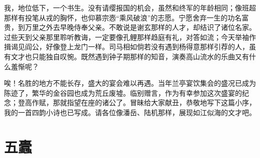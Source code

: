 \documentclass[12pt,UTF-8,openany,a4]{ctexbook}
\begin{document}
\begin{large}
    我，地位低下，一个书生。没有请缨报国的机会，虽然和终军的年龄相同；像班超那样有投笔从戎的胸怀，也仰慕宗悫“乘风破浪”的志愿。宁愿舍弃一生的功名富贵，到万里之外去早晚侍奉父亲。不敢说是谢玄那样的人才，却结识了诸位名家。过些天到父亲那里聆听教诲，一定要像孔鲤那样趋庭有礼，对答如流；今天举袖作揖谒见阎公，好像登上龙门一样。司马相如倘若没有遇到杨得意那样引荐的人，虽有文才也只能独自叹惋。既然遇到钟子期那样的知音，演奏高山流水的乐曲又有什么羞惭呢？
    
    唉！名胜的地方不能长存，盛大的宴会难以再遇。当年兰亭宴饮集会的盛况已成为陈迹了，繁华的金谷园也成为荒丘废墟。临别赠言，作为有幸参加这次盛宴的纪念；登高作赋，那就指望在座的诸公了。冒昧给大家献丑，恭敬地写下这篇小序，我的一首四韵小诗也已写成。请各位像潘岳、陆机那样，展现如江似海的文才吧。
    
\end{large}



\chapter{五蠹}
\end{document}
